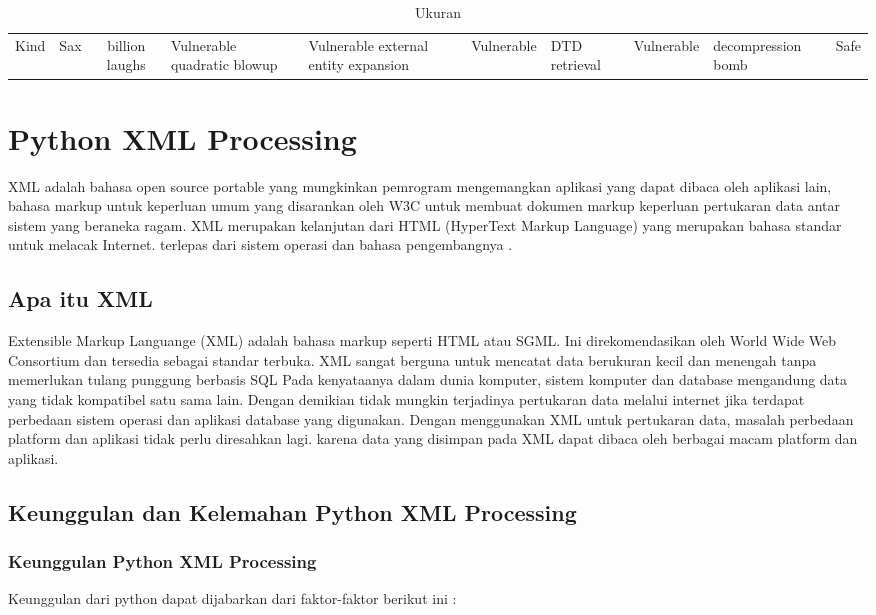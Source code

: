 \begin{table}[ht]
	\caption{Ukuran}
	\begin{tabular*}{\textwidth}{@{\extracolsep{\fill}}lcc}
		\hline
		Kind&  Sax&\cr
		\hline
		billion laughs&Vulnerable\cr
		quadratic blowup&Vulnerable\cr
		external entity expansion&Vulnerable&\cr
		DTD retrieval&Vulnerable&\cr
		decompression bomb&Safe\cr
		\hline
	\end{tabular*}
	\begin{tablenotes}
	\end{tablenotes}
\end{table}

\section{Python XML Processing}
  XML adalah bahasa open source portable yang mungkinkan pemrogram mengemangkan aplikasi yang dapat dibaca oleh aplikasi lain, bahasa markup untuk keperluan umum yang disarankan oleh W3C untuk membuat dokumen markup keperluan pertukaran data antar sistem yang beraneka ragam. XML merupakan kelanjutan dari HTML (HyperText Markup Language) yang merupakan bahasa standar untuk melacak Internet.
terlepas dari sistem operasi dan bahasa pengembangnya .
\subsection{Apa itu XML}
  Extensible Markup Languange (XML) adalah bahasa markup seperti HTML atau SGML. 
Ini direkomendasikan oleh World Wide Web Consortium dan tersedia sebagai standar terbuka.
XML sangat berguna untuk mencatat data berukuran kecil dan menengah tanpa memerlukan tulang punggung berbasis SQL  
Pada kenyataanya dalam dunia komputer, sistem komputer dan database mengandung data yang tidak kompatibel satu sama lain. Dengan demikian tidak mungkin terjadinya pertukaran data melalui internet jika terdapat perbedaan sistem operasi dan aplikasi database yang digunakan.
Dengan menggunakan XML untuk pertukaran data, masalah perbedaan platform dan aplikasi tidak perlu diresahkan lagi. karena data yang disimpan pada XML dapat dibaca oleh berbagai macam platform dan aplikasi.

\subsection{Keunggulan dan Kelemahan Python XML Processing}
\subsubsection{Keunggulan Python XML Processing}
Keunggulan dari python dapat dijabarkan dari faktor-faktor berikut ini :

